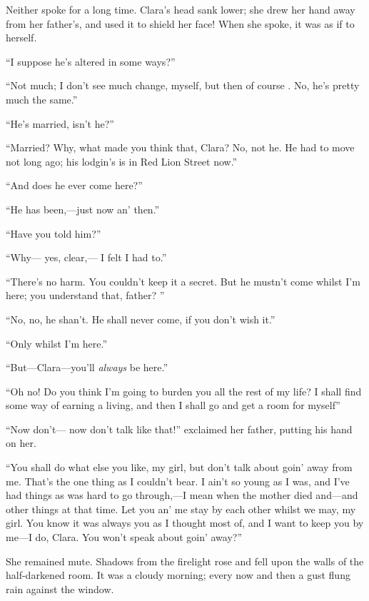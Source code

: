 Neither spoke for a long time. Clara's head sank lower; she drew her
hand away from her father's, and used it to shield her face! When she
spoke, it was as if to herself.

``I suppose he's altered in some ways?''

``Not much; I don't see much change, myself, but then of course . No,
he's pretty much the same.''

``He's married, isn't he?''

``Married? Why, what made you think that, Clara? No, not he. He had to
move not long ago; his lodgin's is in Red Lion Street now.''

``And does he ever come here?''

{\protect\hypertarget{304}{}{}}``He has been,---just now an' then.''

``Have you told him?''

``Why--- yes, clear,--- I felt I had to.''

``There's no harm. You couldn't keep it a secret. But he mustn't come
whilst I'm here; you understand that, father? ''

``No, no, he shan't. He shall never come, if you don't wish it.''

``Only whilst I'm here.''

``But---Clara---you'll \emph{always} be here.''

``Oh no! Do you think I'm going to burden you all the rest of my life? I
shall find some way of earning a living, and then I shall go and get a
room for myself''

``Now don't--- now don't talk like that!'' exclaimed her father, putting
his hand on her.

``You shall do what else you like, my girl, but don't talk about goin'
away from me. That's the one thing as I couldn't bear. I ain't so young
as I was, and I've had things as was hard to go through,---I mean when
the mother died and---and other things at that time. Let you an' me stay
by each other whilst we may, my girl. You know it was
{\protect\hypertarget{305}{}{}}always you as I thought most of, and I
want to keep you by me---I do, Clara. You won't speak about goin'
away?''

She remained mute. Shadows from the firelight rose and fell upon the
walls of the half-darkened room. It was a cloudy morning; every now and
then a gust flung rain against the window.

